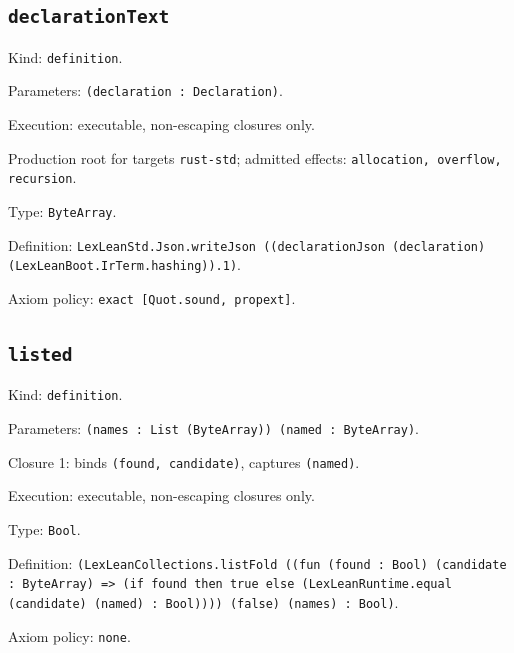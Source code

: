 \documentclass[11pt]{article}
\begin{document}
\subsection*{\texttt{declarationText}}
\noindent Kind: \texttt{definition}.\par
\noindent Parameters: \texttt{(declaration : Declaration)}.\par
\noindent Execution: executable, non-escaping closures only.\par
\noindent Production root for targets \texttt{rust-std}; admitted effects: \texttt{allocation, overflow, recursion}.\par
\noindent Type: \texttt{ByteArray}.\par
\noindent Definition: \texttt{LexLeanStd.Json.writeJson ((declarationJson (declaration) (LexLeanBoot.IrTerm.hashing)).1)}.\par
\noindent Axiom policy: \texttt{exact [Quot.sound, propext]}.\par
\subsection*{\texttt{listed}}
\noindent Kind: \texttt{definition}.\par
\noindent Parameters: \texttt{(names : List (ByteArray)) (named : ByteArray)}.\par
\noindent Closure 1: binds \texttt{(found, candidate)}, captures \texttt{(named)}.\par
\noindent Execution: executable, non-escaping closures only.\par
\noindent Type: \texttt{Bool}.\par
\noindent Definition: \texttt{(LexLeanCollections.listFold ((fun (found : Bool) (candidate : ByteArray) => (if found then true else (LexLeanRuntime.equal (candidate) (named) : Bool)))) (false) (names) : Bool)}.\par
\noindent Axiom policy: \texttt{none}.\par
\end{document}

